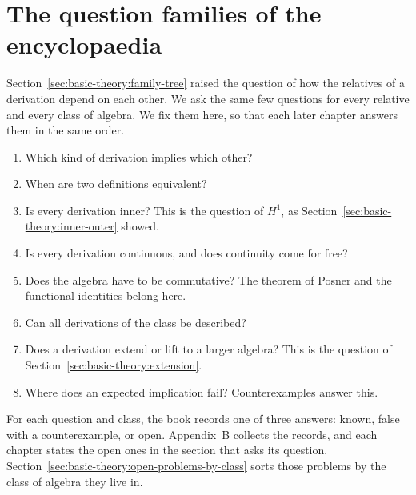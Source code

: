\section{The question families of the encyclopaedia}\label{sec:basic-theory:question-families}

Section~\ref{sec:basic-theory:family-tree} raised the question of how the
relatives of a derivation depend on each other. We ask the same few questions
for every relative and every class of algebra. We fix them here, so that each
later chapter answers them in the same order.

\begin{enumerate}
\item Which kind of derivation implies which other?
\item When are two definitions equivalent?
\item Is every derivation inner? This is the question of $H^1$, as
Section~\ref{sec:basic-theory:inner-outer} showed.
\item Is every derivation continuous, and does continuity come for free?
\item Does the algebra have to be commutative? The theorem of Posner and the
functional identities belong here.
\item Can all derivations of the class be described?
\item Does a derivation extend or lift to a larger algebra? This is the question
of Section~\ref{sec:basic-theory:extension}.
\item Where does an expected implication fail? Counterexamples answer this.
\end{enumerate}

For each question and class, the book records one of three answers: known,
false with a counterexample, or open. Appendix~B collects the records, and
each chapter states the open ones in the section that asks its question.
Section~\ref{sec:basic-theory:open-problems-by-class} sorts those problems by
the class of algebra they live in.
